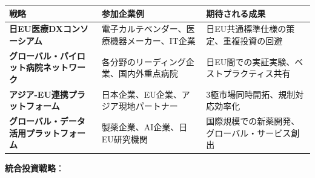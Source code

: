 \documentclass[
  a4paper,
  a4paper,
  11pt]{ltjsbook}
\begin{document}
\begin{longtable}[]{@{}
  >{\raggedright\arraybackslash}p{}
  >{\raggedright\arraybackslash}p{}
  >{\raggedright\arraybackslash}p{}@{}}
\toprule\noalign{}
\begin{minipage}[b]{\linewidth}\raggedright
戦略
\end{minipage} & \begin{minipage}[b]{\linewidth}\raggedright
参加企業例
\end{minipage} & \begin{minipage}[b]{\linewidth}\raggedright
期待される成果
\end{minipage} \\
\midrule\noalign{}
\endhead
\bottomrule\noalign{}
\endlastfoot
\textbf{日EU医療DXコンソーシアム} &
電子カルテベンダー、医療機器メーカー、IT企業 &
日EU共通標準仕様の策定、重複投資の回避 \\
\textbf{グローバル・パイロット病院ネットワーク} &
各分野のリーディング企業、国内外重点病院 &
日EU間での実証実験、ベストプラクティス共有 \\
\textbf{アジア-EU連携プラットフォーム} &
日本企業、EU企業、アジア現地パートナー &
3極市場同時開拓、規制対応効率化 \\
\textbf{グローバル・データ活用プラットフォーム} &
製薬企業、AI企業、日EU研究機関 &
国際規模での新薬開発、グローバル・サービス創出 \\
\end{longtable}

\textbf{統合投資戦略}：
\end{document}
